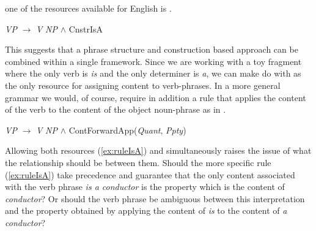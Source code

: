 one of the resources available for English is \nexteg{}.
\begin{ex} 
\textit{VP} $\longrightarrow$ \textit{V} \textit{NP} \d{\d{$\wedge$}} CnstrIsA 
\label{ex:ruleIsA}
\end{ex} 
This suggests that a phrase structure and construction based
approach can be combined within a single framework.  Since we are
working with a toy fragment where the only verb is \textit{is} and the
only determiner is \textit{a}, we can make do with \preveg{} as the
only resource for assigning content to verb-phrases.  In a more
general grammar we would, of course, require in addition a rule that
applies the content of the verb to the content of the object
noun-phrase as in \nexteg{}.
\begin{ex} 
\textit{VP} $\longrightarrow$ \textit{V} \textit{NP} \d{\d{$\wedge$}}
ContForwardApp(\textit{Quant}, \textit{Ppty})  
\label{ex:VPForwardApp}
\end{ex} 
Allowing both resources (\ref{ex:ruleIsA}) and \preveg{} simultaneously raises the issue of what the
relationship should be between them.  Should the more specific rule
(\ref{ex:ruleIsA}) take precedence and guarantee that the only content
associated with the verb phrase \textit{is a conductor} is the
property which is the content of \textit{conductor}?  Or should the
verb phrase be ambiguous between this interpretation and the property
obtained by applying the content of \textit{is} to the content of
\textit{a conductor}?  

